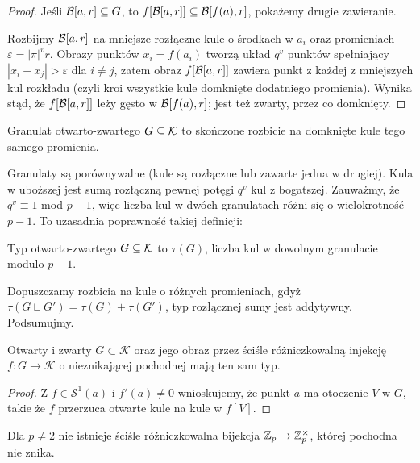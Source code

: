 \begin{proof}
	Jeśli $\mathcal B[a, r] \subseteq G$, to $f[\mathcal B[a, r]] \subseteq \mathcal B[f(a), r]$, pokażemy drugie zawieranie.
	
	Rozbijmy $\mathcal B[a, r]$ na mniejsze rozłączne kule o środkach w $a_i$ oraz promieniach $\varepsilon = |\pi|^v r$.
	Obrazy punktów $x_i = f(a_i)$ tworzą układ $q^v$ punktów spełniający $|x_i - x_j| > \varepsilon$ dla $i \neq j$, zatem obraz $f[\mathcal B[a, r]]$ zawiera punkt z każdej z mniejszych kul rozkładu (czyli kroi wszystkie kule domknięte dodatniego promienia).
	Wynika stąd, że $f[\mathcal B[a, r]]$ leży gęsto w $\mathcal B[f(a), r]$; jest też zwarty, przez co domknięty.
\end{proof}

\begin{definicja}
	Granulat otwarto-zwartego $G \subseteq \mathcal K$ to skończone rozbicie na domknięte kule tego samego promienia.
\end{definicja}

Granulaty są porównywalne (kule są rozłączne lub zawarte jedna w drugiej).
Kula w uboższej jest sumą rozłączną pewnej potęgi $q^v$ kul z bogatszej.
Zauważmy, że $q^v \equiv 1$ mod $p-1$, więc liczba kul w dwóch granulatach różni się o wielokrotność $p-1$.
To uzasadnia poprawność takiej definicji:

\begin{definicja}
	Typ otwarto-zwartego $G \subseteq \mathcal K$ to $\tau(G)$, liczba kul w dowolnym granulacie modulo $p-1$.
\end{definicja}

Dopuszczamy rozbicia na kule o różnych promieniach, gdyż $\tau(G \sqcup G') = \tau(G) + \tau(G')$, typ rozłącznej sumy jest addytywny.
Podsumujmy.

\begin{fakt}
	Otwarty i zwarty $G \subset \mathcal K$ oraz jego obraz przez ściśle różniczkowalną injekcję $f \colon G \to \mathcal K$ o nieznikającej pochodnej mają ten sam typ.
\end{fakt}

\begin{proof}
	Z $f \in \mathcal S^1(a)$ i $f'(a) \neq 0$ wnioskujemy, że punkt $a$ ma otoczenie $V$ w $G$, takie że $f$ przerzuca otwarte kule na kule w $f[V]$.
\end{proof}

\begin{wniosek}
	Dla $p \neq 2$ nie istnieje ściśle różniczkowalna bijekcja $\mathbb Z_p \to \mathbb Z_p^\times$, której pochodna nie znika.
\end{wniosek}

